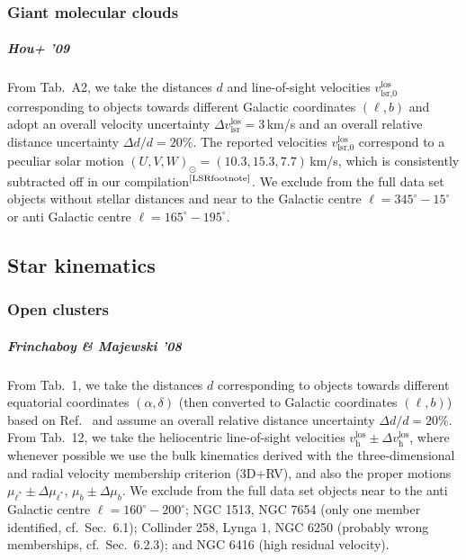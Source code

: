 \documentclass[twocolumn,prd,reprint,preprintnumbers,amsmath,amssymb,superscriptaddress,nofootinbib]{revtex4}
\begin{document}
\subsubsection{Giant molecular clouds}

\subparagraph{Hou+ '09 \cite{Hou2009}} From Tab.~A2, we take the distances $d$ and line-of-sight velocities $v_{\textrm{lsr,0}}^{\textrm{los}}$ corresponding to objects towards different Galactic coordinates $(\ell,b)$ and adopt an overall velocity uncertainty $\Delta v_{\textrm{lsr}}^{\textrm{los}}=3\,$km/s and an overall relative distance uncertainty $\Delta d/d=20\%$. The reported velocities $v_{\textrm{lsr,0}}^{\textrm{los}}$ correspond to a peculiar solar motion $(U,V,W)_{\odot}=(10.3,15.3,7.7)\,$km/s, which is consistently subtracted off in our compilation$^\text{\ref{LSRfootnote}}$. We exclude from the full data set objects without stellar distances and near to the Galactic centre $\ell=345^{\circ}-15^{\circ}$ or anti Galactic centre $\ell=165^{\circ}-195^{\circ}$.




\subsection{Star kinematics}


\subsubsection{Open clusters}

\subparagraph{Frinchaboy \& Majewski '08 \cite{FrinchaboyMajewski2008}} From Tab.~1, we take the distances $d$ corresponding to objects towards different equatorial coordinates $(\alpha,\delta)$ (then converted to Galactic coordinates $(\ell,b)$) based on Ref.~\cite{Dias2002} and assume an overall relative distance uncertainty $\Delta d/d=20\%$. From Tab.~12, we take the heliocentric line-of-sight velocities $v_{\textrm{h}}^{\textrm{los}}\pm \Delta v_{\textrm{h}}^{\textrm{los}}$, where whenever possible we use the bulk kinematics derived with the three-dimensional and radial velocity membership criterion (3D+RV), and also the proper motions $\mu_{\ell^\ast} \pm \Delta \mu_{\ell^\ast}$, $\mu_b \pm \Delta \mu_b$. We exclude from the full data set objects near to the anti Galactic centre $\ell=160^{\circ}-200^{\circ}$; NGC 1513, NGC 7654 (only one member identified, cf.~Sec.~6.1); Collinder 258, Lynga 1, NGC 6250 (probably wrong memberships, cf.~Sec.~6.2.3); and NGC 6416 (high residual velocity).
\end{document}
